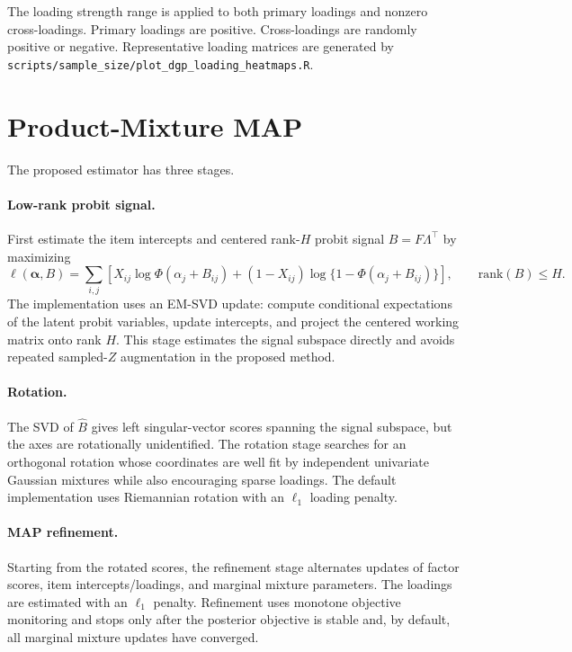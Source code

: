 \documentclass[11pt]{article}
\newcommand{\PhiN}{\Phi}
\begin{document}
The loading strength range is applied to both primary loadings and nonzero
cross-loadings.  Primary loadings are positive.  Cross-loadings are randomly
positive or negative.  Representative loading matrices are generated by
\texttt{scripts/sample\_size/plot\_dgp\_loading\_heatmaps.R}.

\section{Product-Mixture MAP}

The proposed estimator has three stages.

\paragraph{Low-rank probit signal.}
First estimate the item intercepts and centered rank-$H$ probit signal
$B=F\Lambda^\top$ by maximizing
\[
  \ell(\bm\alpha,B)
  =
  \sum_{i,j}
  \left[
  X_{ij}\log \PhiN(\alpha_j+B_{ij})
  +(1-X_{ij})\log\{1-\PhiN(\alpha_j+B_{ij})\}
  \right],
  \qquad \mathrm{rank}(B)\le H.
\]
The implementation uses an EM-SVD update: compute conditional expectations of
the latent probit variables, update intercepts, and project the centered
working matrix onto rank $H$.  This stage estimates the signal subspace
directly and avoids repeated sampled-$Z$ augmentation in the proposed method.

\paragraph{Rotation.}
The SVD of $\widehat B$ gives left singular-vector scores spanning the signal
subspace, but the axes are rotationally unidentified.  The rotation stage
searches for an orthogonal rotation whose coordinates are well fit by
independent univariate Gaussian mixtures while also encouraging sparse
loadings.  The default implementation uses Riemannian rotation with an
$\ell_1$ loading penalty.

\paragraph{MAP refinement.}
Starting from the rotated scores, the refinement stage alternates updates of
factor scores, item intercepts/loadings, and marginal mixture parameters.  The
loadings are estimated with an $\ell_1$ penalty.  Refinement uses monotone
objective monitoring and stops only after the posterior objective is stable
and, by default, all marginal mixture updates have converged.
\end{document}
